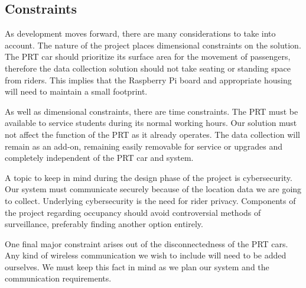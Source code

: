 \subsection{Constraints}
As development moves forward, there are many considerations to take into account. The nature of the project places dimensional constraints on the solution. The PRT car should prioritize its surface area for the movement of passengers, therefore the data collection solution should not take seating or standing space from riders. This implies that the Raspberry Pi board and appropriate housing will need to maintain a small footprint.

As well as dimensional constraints, there are time constraints. The PRT must be available to service students during its normal working hours. Our solution must not affect the function of the PRT as it already operates. The data collection will remain as an add-on, remaining easily removable for service or upgrades and completely independent of the PRT car and system.

A topic to keep in mind during the design phase of the project is cybersecurity. Our system must communicate securely because of the location data we are going to collect. Underlying cybersecurity is the need for rider privacy. Components of the project regarding occupancy should avoid controversial methods of surveillance, preferably finding another option entirely.

One final major constraint arises out of the disconnectedness of the PRT cars. Any kind of wireless communication we wish to include will need to be added ourselves. We must keep this fact in mind as we plan our system and the communication requirements.
